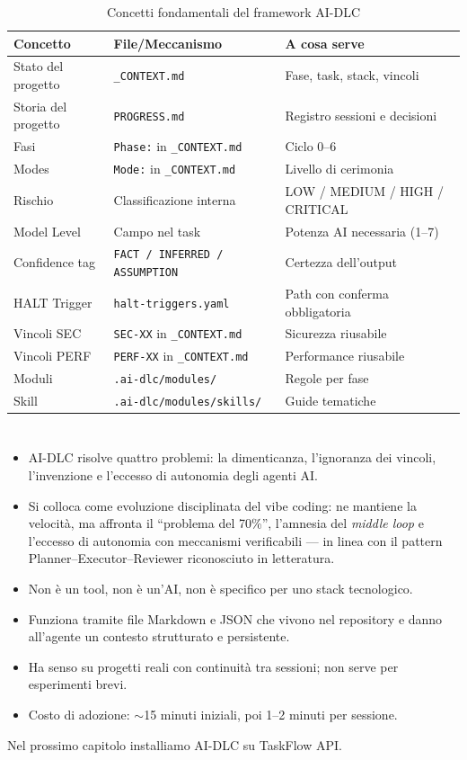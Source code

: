 \begin{table}[htbp]
  \centering
  \begin{tabular}{lll}
    \toprule
    \textbf{Concetto} & \textbf{File/Meccanismo} & \textbf{A cosa serve} \\
    \midrule
    Stato del progetto & \texttt{\_CONTEXT.md} & Fase, task, stack, vincoli \\
    Storia del progetto & \texttt{PROGRESS.md} & Registro sessioni e decisioni \\
    Fasi & \texttt{Phase:} in \texttt{\_CONTEXT.md} & Ciclo 0--6 \\
    Modes & \texttt{Mode:} in \texttt{\_CONTEXT.md} & Livello di cerimonia \\
    Rischio & Classificazione interna & LOW / MEDIUM / HIGH / CRITICAL \\
    Model Level & Campo nel task & Potenza AI necessaria (1--7) \\
    Confidence tag & \texttt{FACT / INFERRED / ASSUMPTION} & Certezza dell'output \\
    HALT Trigger & \texttt{halt-triggers.yaml} & Path con conferma obbligatoria \\
    Vincoli SEC & \texttt{SEC-XX} in \texttt{\_CONTEXT.md} & Sicurezza riusabile \\
    Vincoli PERF & \texttt{PERF-XX} in \texttt{\_CONTEXT.md} & Performance riusabile \\
    Moduli & \texttt{.ai-dlc/modules/} & Regole per fase \\
    Skill & \texttt{.ai-dlc/modules/skills/} & Guide tematiche \\
    \bottomrule
  \end{tabular}
  \caption{Concetti fondamentali del framework AI-DLC}
  \label{tab:01-concetti}
\end{table}

\section*{\LabelSummary}

\begin{itemize}
  \item AI-DLC risolve quattro problemi: la dimenticanza, l'ignoranza dei vincoli, l'invenzione e l'eccesso di autonomia degli agenti AI.
  \item Si colloca come evoluzione disciplinata del vibe coding: ne mantiene la velocità, ma affronta il ``problema del 70\%'', l'amnesia del \textit{middle loop} e l'eccesso di autonomia con meccanismi verificabili --- in linea con il pattern Planner--Executor--Reviewer riconosciuto in letteratura.
  \item Non è un tool, non è un'AI, non è specifico per uno stack tecnologico.
  \item Funziona tramite file Markdown e JSON che vivono nel repository e danno all'agente un contesto strutturato e persistente.
  \item Ha senso su progetti reali con continuità tra sessioni; non serve per esperimenti brevi.
  \item Costo di adozione: $\sim$15 minuti iniziali, poi 1--2 minuti per sessione.
\end{itemize}

Nel prossimo capitolo installiamo AI-DLC su TaskFlow API.
